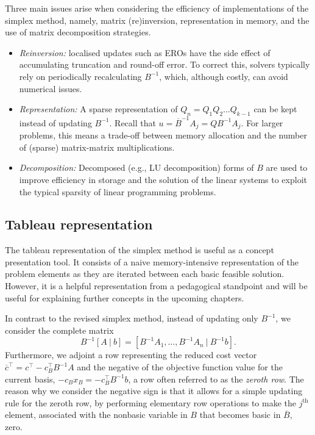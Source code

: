 Three main issues arise when considering the efficiency of implementations of the simplex method, namely, matrix (re)inversion, representation in memory, and the use of matrix decomposition strategies.
%
\begin{itemize}
	\item \emph{Reinversion:} localised updates such as EROs have the side effect of accumulating truncation and round-off error. To correct this, solvers typically rely on periodically recalculating $B^{-1}$, which, although costly, can avoid numerical issues.
	\item \emph{Representation:} A sparse representation of $Q_n = Q_1Q_2 \dots Q_{k-1}$ can be kept instead of updating $B^{-1}$. Recall that $u = \overline{B}^{-1}A_j = QB^{-1}A_j$. For larger problems, this means a trade-off between memory allocation and the number of (sparse) matrix-matrix multiplications.
	\item \emph{Decomposition:} Decomposed (e.g., LU decomposition) forms of $B$ are used to improve efficiency in storage and the solution of the linear systems to exploit the typical sparsity of linear programming problems.  	
\end{itemize}



\subsection{Tableau representation}

The tableau representation of the simplex method is useful as a concept presentation tool. It consists of a naive memory-intensive representation of the problem elements as they are iterated between each basic feasible solution. However, it is a helpful representation from a pedagogical standpoint and will be useful for explaining further concepts in the upcoming chapters. 

In contrast to the revised simplex method, instead of updating only $B^{-1}$, we consider the complete matrix 
%
\begin{equation*}
	B^{-1}[A ~|~ b] = \left[B^{-1}A_1, \dots, B^{-1}A_n ~|~  B^{-1}b\right].		
\end{equation*}
%
Furthermore, we adjoint a row representing the reduced cost vector $\overline{c}^\top = c^\top - c_B^\top B^{-1}A$ and the negative of the objective function value for the current basis, $ -c_Bx_B = -c_B^\top B^{-1}b$, a row often referred to as the \emph{zeroth row}. The reason why we consider the negative sign is that it allows for a simple updating rule for the zeroth row, by performing elementary row operations to make the $j^\text{th}$ element, associated with the nonbasic variable in $B$ that becomes basic in $\overline{B}$, zero.

